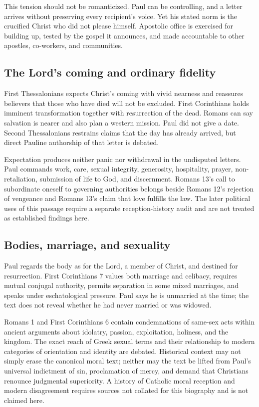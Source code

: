 This tension should not be romanticized. Paul can be controlling, and a letter
arrives without preserving every recipient's voice. Yet his stated norm is the
crucified Christ who did not please himself. Apostolic office is exercised for
building up, tested by the gospel it announces, and made accountable to other
apostles, co-workers, and communities.

\subsection{The Lord's coming and ordinary fidelity}

First Thessalonians expects Christ's coming with vivid nearness and reassures
believers that those who have died will not be excluded. First Corinthians
holds imminent transformation together with resurrection of the dead. Romans
can say salvation is nearer and also plan a western mission. Paul did not give
a date. Second Thessalonians restrains claims that the day has already arrived,
but direct Pauline authorship of that letter is debated.

Expectation produces neither panic nor withdrawal in the undisputed letters.
Paul commands work, care, sexual integrity, generosity, hospitality, prayer,
non-retaliation, submission of life to God, and discernment. Romans 13's call
to subordinate oneself to governing authorities belongs beside Romans 12's
rejection of vengeance and Romans 13's claim that love fulfills the law. The
later political uses of this passage require a separate reception-history
audit and are not treated as established findings here.

\subsection{Bodies, marriage, and sexuality}

Paul regards the body as for the Lord, a member of Christ, and destined for
resurrection. First Corinthians 7 values both marriage and celibacy, requires
mutual conjugal authority, permits separation in some mixed marriages, and
speaks under eschatological pressure. Paul says he is unmarried at the time;
the text does not reveal whether he had never married or was widowed.

Romans 1 and First Corinthians 6 contain condemnations of same-sex acts within
ancient arguments about idolatry, passion, exploitation, holiness, and the
kingdom. The exact reach of Greek sexual terms and their relationship to
modern categories of orientation and identity are debated. Historical context
may not simply erase the canonical moral text; neither may the text be lifted
from Paul's universal indictment of sin, proclamation of mercy, and demand
that Christians renounce judgmental superiority. A history of Catholic moral
reception and modern disagreement requires sources not collated for this
biography and is not claimed here.

